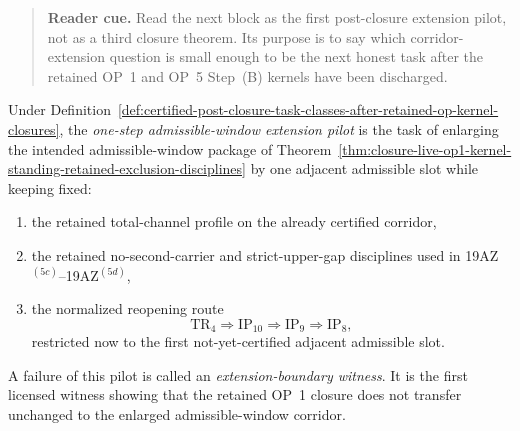 \begin{quote}\small
\noindent\textbf{Reader cue.} Read the next block as the first post-closure extension pilot, not as a third closure theorem. Its purpose is to say which corridor-extension question is small enough to be the next honest task after the retained OP~1 and OP~5 Step~(B) kernels have been discharged.
\end{quote}

\begin{definition}
\label{def:one-step-admissible-window-extension-pilot-post-closure-op1-line}
Under Definition~\ref{def:certified-post-closure-task-classes-after-retained-op-kernel-closures}, the \emph{one-step admissible-window extension pilot} is the task of enlarging the intended admissible-window package of Theorem~\ref{thm:closure-live-op1-kernel-standing-retained-exclusion-disciplines} by one adjacent admissible slot while keeping fixed:
\begin{enumerate}[leftmargin=2em,label=(\roman*)]
  \item the retained total-channel profile on the already certified corridor,
  \item the retained no-second-carrier and strict-upper-gap disciplines used in 19AZ$^{(5c)}$--19AZ$^{(5d)}$,
  \item the normalized reopening route
  \[
  \mathrm{TR}_4 \Longrightarrow \mathrm{IP}_{10} \Longrightarrow \mathrm{IP}_9 \Longrightarrow \mathrm{IP}_8,
  \]
  restricted now to the first not-yet-certified adjacent admissible slot.
\end{enumerate}
A failure of this pilot is called an \emph{extension-boundary witness}. It is the first licensed witness showing that the retained OP~1 closure does not transfer unchanged to the enlarged admissible-window corridor.
\end{definition}

